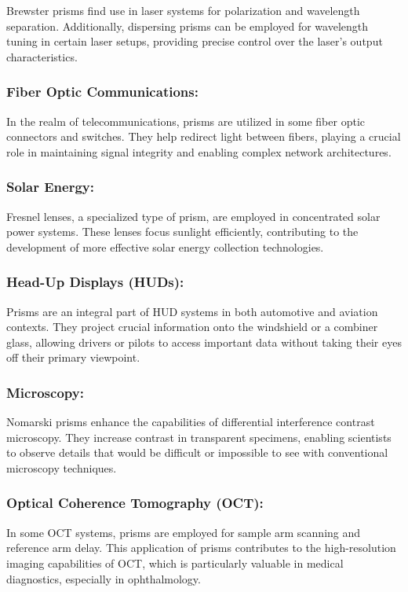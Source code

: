 \documentclass[
  a4paper,
]{book}
\begin{document}
\begin{tcolorbox}
Brewster prisms find use in laser systems for polarization and
wavelength separation. Additionally, dispersing prisms can be employed
for wavelength tuning in certain laser setups, providing precise control
over the laser's output characteristics.

\subsubsection{Fiber Optic
Communications:}\label{fiber-optic-communications}

In the realm of telecommunications, prisms are utilized in some fiber
optic connectors and switches. They help redirect light between fibers,
playing a crucial role in maintaining signal integrity and enabling
complex network architectures.

\subsubsection{Solar Energy:}\label{solar-energy}

Fresnel lenses, a specialized type of prism, are employed in
concentrated solar power systems. These lenses focus sunlight
efficiently, contributing to the development of more effective solar
energy collection technologies.

\subsubsection{Head-Up Displays (HUDs):}\label{head-up-displays-huds}

Prisms are an integral part of HUD systems in both automotive and
aviation contexts. They project crucial information onto the windshield
or a combiner glass, allowing drivers or pilots to access important data
without taking their eyes off their primary viewpoint.

\subsubsection{Microscopy:}\label{microscopy}

Nomarski prisms enhance the capabilities of differential interference
contrast microscopy. They increase contrast in transparent specimens,
enabling scientists to observe details that would be difficult or
impossible to see with conventional microscopy techniques.

\subsubsection{Optical Coherence Tomography
(OCT):}\label{optical-coherence-tomography-oct}

In some OCT systems, prisms are employed for sample arm scanning and
reference arm delay. This application of prisms contributes to the
high-resolution imaging capabilities of OCT, which is particularly
valuable in medical diagnostics, especially in ophthalmology.

\end{tcolorbox}
\end{document}
